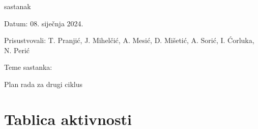 \begin{packed_enum}
	  \item  sastanak
			\item[] \begin{packed_item}
			  \item Datum: 08. siječnja 2024.
				\item Prisustvovali:  T. Pranjić, J. Mihelčić, A. Mesić, D. Mišetić, A. Sorić, I. Ćorluka, N. Perić
				\item Teme sastanka:
				\begin{packed_item}
					\item  Plan rada za drugi ciklus
        \end{packed_item}
	\end{packed_item}

 
		\end{packed_enum}
		
		\eject
		\section*{Tablica aktivnosti}
		
			

